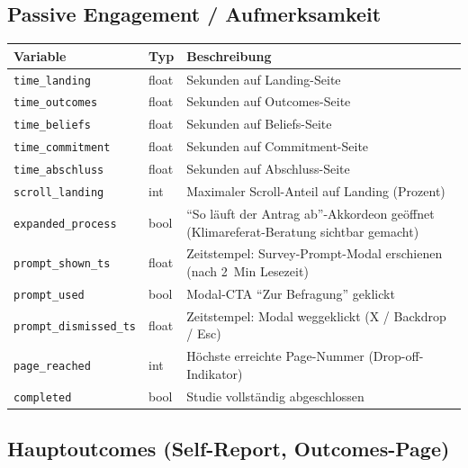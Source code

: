 \documentclass[11pt, a4paper]{scrartcl}
\newcommand{\var}[1]{\texttt{\small #1}}
\begin{document}
\subsection{Passive Engagement / Aufmerksamkeit}

\begin{longtable}{@{}p{3.6cm} p{2.0cm} p{9.5cm}@{}}
\toprule
\textbf{Variable} & \textbf{Typ} & \textbf{Beschreibung} \\
\midrule
\endhead
\var{time\_landing}           & float & Sekunden auf Landing-Seite \\
\var{time\_outcomes}          & float & Sekunden auf Outcomes-Seite \\
\var{time\_beliefs}           & float & Sekunden auf Beliefs-Seite \\
\var{time\_commitment}        & float & Sekunden auf Commitment-Seite \\
\var{time\_abschluss}         & float & Sekunden auf Abschluss-Seite \\
\var{scroll\_landing}         & int   & Maximaler Scroll-Anteil auf Landing (Prozent) \\
\var{expanded\_process}       & bool  & \enquote{So läuft der Antrag ab}-Akkordeon geöffnet (Klimareferat-Beratung sichtbar gemacht) \\
\var{prompt\_shown\_ts}       & float & Zeitstempel: Survey-Prompt-Modal erschienen (nach 2~Min Lesezeit) \\
\var{prompt\_used}            & bool  & Modal-CTA \enquote{Zur Befragung} geklickt \\
\var{prompt\_dismissed\_ts}   & float & Zeitstempel: Modal weggeklickt (X / Backdrop / Esc) \\
\var{page\_reached}           & int   & Höchste erreichte Page-Nummer (Drop-off-Indikator) \\
\var{completed}               & bool  & Studie vollständig abgeschlossen \\
\bottomrule
\end{longtable}

\subsection{Hauptoutcomes (Self-Report, Outcomes-Page)}
\end{document}
